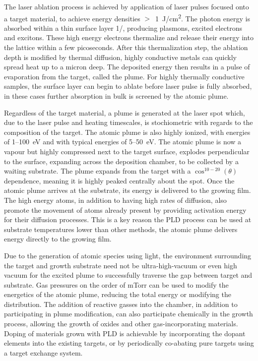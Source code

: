 The laser ablation process is achieved by application of laser pulses focused onto a target material, to achieve energy densities \(>\)~1~J/cm\textsuperscript{2}.
The photon energy is absorbed within a thin surface layer 1/\textalpha{}, producing plasmons, excited electrons and excitons\cite{Willmott2000}.
These high energy electrons thermalize and release their energy into the lattice within a few picoseconds.
After this thermalization step, the ablation depth is modified by thermal diffusion, highly conductive metals can quickly spread heat up to a micron deep.
The deposited energy then results in a pulse of evaporation from the target, called the plume.
For highly thermally conductive samples, the surface layer can begin to ablate before laser pulse is fully absorbed, in these cases further absorption in bulk is screened by the atomic plume\cite{Willmott2000}.

Regardless of the target material, a plume is generated at the laser spot which, due to the laser pulse and heating timescales, is stochiometric with regards to the composition of the target.
The atomic plume is also highly ionized, with energies of 1--100~eV and with typical energies of 5--50~eV\@. The atomic plume is now a vapour but highly compressed next to the target surface, explodes perpendicular to the surface, expanding across the deposition chamber, to be collected by a waiting substrate.
The plume expands from the target with a \(\cos^{10-20}(\theta)\)
dependence, meaning it is highly peaked centrally about the spot.
Once the atomic plume arrives at the substrate, its energy is delivered to the growing film.
The high energy atoms, in addition to having high rates of diffusion, also promote the movement of atoms already present by providing activation energy for their diffusion processes\cite{Willmott2000}.
This is a key reason the PLD process can be used at substrate temperatures lower than other methods, the atomic plume delivers energy directly to the growing film.

Due to the generation of atomic species using light, the environment surrounding the target and growth substrate need not be ultra-high-vacuum or even high vacuum for the excited plume to successfully traverse the gap between target and substrate.
Gas pressures on the order of mTorr can be used to modify the energetics of the atomic plume, reducing the total energy or modifying the distribution\cite{Willmott2000}.
The addition of reactive gasses into the chamber, in addition to participating in plume modification, can also participate chemically in the growth process, allowing the growth of oxides and other gas-incorporating materials.
Doping of materials grown with PLD is achievable by incorporating the dopant elements into the existing targets, or by periodically co-abating pure targets using a target exchange system.

